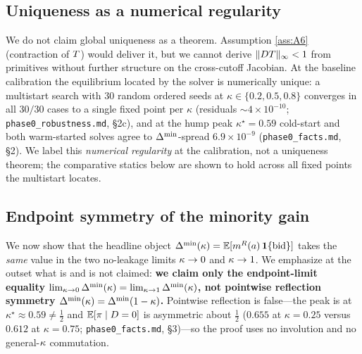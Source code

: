 \subsection{Uniqueness as a numerical regularity}

\begin{remark}
\label{rem:numreg}
We do not claim global uniqueness as a theorem. Assumption \ref{ass:A6}
(contraction of $T$) would deliver it, but we cannot derive
$\|DT\|_\infty<1$ from primitives without further structure on the
cross-cutoff Jacobian. At the baseline calibration the equilibrium located by the
solver is numerically unique: a multistart search with $30$ random ordered seeds
at $\kappa\in\{0.2,0.5,0.8\}$ converges in all $30/30$ cases to a single fixed
point per $\kappa$ (residuals $\sim4\times10^{-10}$;
\texttt{phase0\_robustness.md}, \S2c), and at the hump peak $\kappa^\star=0.59$
cold-start and both warm-started solves agree to $\Delta^{\min}$-spread
$6.9\times10^{-9}$ (\texttt{phase0\_facts.md}, \S2). We label this
\emph{numerical regularity} at the calibration, not a uniqueness theorem; the
comparative statics below are shown to hold across all fixed points the
multistart locates.
\end{remark}

\subsection{Endpoint symmetry of the minority gain}

We now show that the headline object $\Delta^{\min}(\kappa)=\mathbb{E}[m^{R}(a)\,\mathbf{1}\{\text{bid}\}]$
takes the \emph{same} value in the two no-leakage limits $\kappa\to0$ and
$\kappa\to1$. We emphasize at the outset what is and is not claimed: \textbf{we
claim only the endpoint-limit equality
$\lim_{\kappa\to0}\Delta^{\min}(\kappa)=\lim_{\kappa\to1}\Delta^{\min}(\kappa)$, not pointwise reflection
symmetry $\Delta^{\min}(\kappa)=\Delta^{\min}(1-\kappa)$.} Pointwise reflection is false---the peak is
at $\kappa^\star\approx0.59\neq\tfrac12$ and $\mathbb{E}[\pi\mid D=0]$ is asymmetric about
$\tfrac12$ ($0.655$ at $\kappa=0.25$ versus $0.612$ at $\kappa=0.75$;
\texttt{phase0\_facts.md}, \S3)---so the proof uses no involution and no
general-$\kappa$ commutation.


